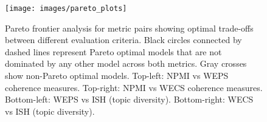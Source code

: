 \begin{landscape}
\begin{figure}[htbp]
\centering
\texttt{[image: images/pareto\_plots]}
\caption{Pareto frontier analysis for metric pairs showing optimal trade-offs between different evaluation criteria. Black circles connected by dashed lines represent Pareto optimal models that are not dominated by any other model across both metrics. Gray crosses show non-Pareto optimal models. Top-left: NPMI vs WEPS coherence measures. Top-right: NPMI vs WECS coherence measures. Bottom-left: WEPS vs ISH (topic diversity). Bottom-right: WECS vs ISH (topic diversity).}
\label{fig:pareto_plots}
\end{figure}
\end{landscape}